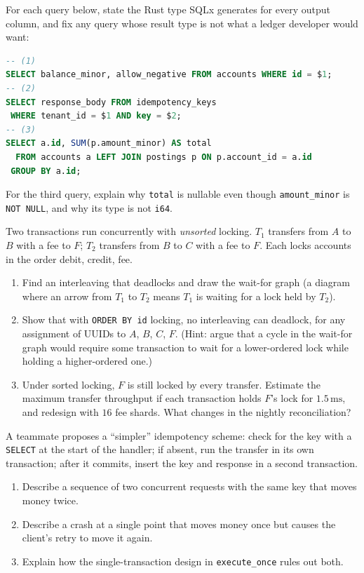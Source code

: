 \begin{exercise}
For each query below, state the Rust type SQLx generates for every output column, and fix any query whose result type is not what a ledger developer would want:
\begin{lstlisting}[language=SQL]
-- (1)
SELECT balance_minor, allow_negative FROM accounts WHERE id = $1;
-- (2)
SELECT response_body FROM idempotency_keys
 WHERE tenant_id = $1 AND key = $2;
-- (3)
SELECT a.id, SUM(p.amount_minor) AS total
  FROM accounts a LEFT JOIN postings p ON p.account_id = a.id
 GROUP BY a.id;
\end{lstlisting}
For the third query, explain why \texttt{total} is nullable even though \texttt{amount\_minor} is \texttt{NOT NULL}, and why its type is not \texttt{i64}.
\end{exercise}

\begin{exercise}
Two transactions run concurrently with \emph{unsorted} locking. $T_1$ transfers from $A$ to $B$ with a fee to $F$; $T_2$ transfers from $B$ to $C$ with a fee to $F$. Each locks accounts in the order debit, credit, fee.
\begin{enumerate}
  \item Find an interleaving that deadlocks and draw the wait-for graph (a diagram where an arrow from $T_1$ to $T_2$ means $T_1$ is waiting for a lock held by $T_2$).
  \item Show that with \texttt{ORDER BY id} locking, no interleaving can deadlock, for any assignment of UUIDs to $A$, $B$, $C$, $F$. (Hint: argue that a cycle in the wait-for graph would require some transaction to wait for a lower-ordered lock while holding a higher-ordered one.)
  \item Under sorted locking, $F$ is still locked by every transfer. Estimate the maximum transfer throughput if each transaction holds $F$'s lock for $1.5\,\text{ms}$, and redesign with $16$ fee shards. What changes in the nightly reconciliation?
\end{enumerate}
\end{exercise}

\begin{exercise}
A teammate proposes a ``simpler'' idempotency scheme: check for the key with a \texttt{SELECT} at the start of the handler; if absent, run the transfer in its own transaction; after it commits, insert the key and response in a second transaction.
\begin{enumerate}
  \item Describe a sequence of two concurrent requests with the same key that moves money twice.
  \item Describe a crash at a single point that moves money once but causes the client's retry to move it again.
  \item Explain how the single-transaction design in \texttt{execute\_once} rules out both.
\end{enumerate}
\end{exercise}

